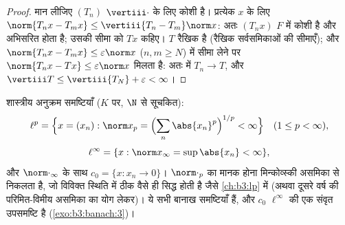\begin{proof}
मान लीजिए $(T_n)$ $\vertiii\cdot$ के लिए कोशी है। प्रत्येक $x$ के लिए $\norm{T_nx - T_mx} \leq \vertiii{T_n - T_m}\norm x$:
अतः $(T_nx)$ $F$ में कोशी है और अभिसरित होता है; उसकी सीमा को $Tx$
कहिए। $T$ रैखिक है (रैखिक सर्वसमिकाओं की सीमाएँ); और $\norm{T_nx - T_mx} \leq \varepsilon\norm x$
($n, m \geq N$) में सीमा लेने पर $\norm{T_nx - Tx} \leq \varepsilon\norm x$ मिलता है: अतः  में $T_n \to T$,
और $\vertiii T \leq \vertiii{T_N} +
\varepsilon < \infty$।
\end{proof}

\begin{definition}\label{def:b3:banach:lp}
शास्त्रीय अनुक्रम समष्टियाँ ($K$
पर, $\N$ से सूचकित):
\[
\ell^p = \Bigl\{x = (x_n) : \norm x_p = \Bigl(\sum_n
\abs{x_n}^p\Bigr)^{1/p} < \infty\Bigr\}\quad (1 \leq p <
\infty),
\]
\[
\ell^\infty = \{x : \norm x_\infty = \sup\abs{x_n} < \infty\},
\]
और $\norm\cdot_\infty$ के साथ $c_0 = \{x : x_n \to 0\}$। $\norm\cdot_p$ का मानक होना मिन्कोव्स्की असमिका से
निकलता है, जो विविक्त स्थिति में ठीक वैसे ही सिद्ध होती है जैसे
\cref{ch:b3:lp} में (अथवा दूसरे वर्ष की परिमित-विमीय असमिका का योग लेकर)।
ये सभी बानाख समष्टियाँ हैं, और $c_0$ $\ell^\infty$ की एक संवृत उपसमष्टि है
(\cref{exo:b3:banach:3})।
\end{definition}

